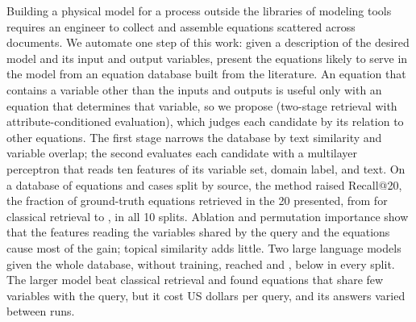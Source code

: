 Building a physical model for a process outside the libraries of modeling tools requires an
engineer to collect and assemble equations scattered across documents. We automate one
step of this work: given a description of the desired model and its input and output
variables, present the equations likely to serve in the model from an equation database built from
the literature. An equation that contains a variable other than the inputs and outputs is useful
only with an equation that determines that variable, so we propose \ours{} (two-stage retrieval with
attribute-conditioned evaluation), which judges each candidate by its relation to other equations. The first stage narrows the
database by text similarity and variable overlap; the second evaluates each candidate with a
multilayer perceptron that reads ten features of its variable set, domain label, and text. On a database
of \NEq{} equations and \NCases{} cases split by source, the method raised Recall@20, the fraction
of ground-truth equations retrieved in the 20 presented, from \RecABase{} for classical
retrieval to \RecAProp, in all 10 splits. Ablation and permutation importance show that the
features reading the variables shared by the query and the equations cause most of the gain;
topical similarity adds little. Two large language models given the whole database,
without training, reached \RecAOpus{} and \RecAHaiku, below \ours{} in every split. The larger model beat classical retrieval and found equations that share few
variables with the query, but it cost \CostPerCallOpus{} US dollars per query, and its answers
varied between runs.
